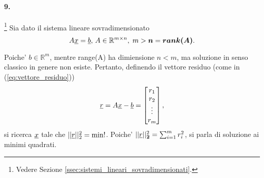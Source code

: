 \paragraph{9.}\footnote{Vedere Sezione \ref{ssec:sistemi_lineari_sovradimensionati}.} Sia dato il sistema lineare sovradimensionato
\begin{equation*}
	A\uline x =\uline b,\, A\in\mathbb R^{m\times n},\; m>\boldsymbol n = \boldsymbol{rank(A)}.
\end{equation*}

Poiche' $b\in\mathbb{R}^m$, mentre \gls{range(A)} ha dimiensione $n<m$, ma soluzione in senso classico in genere non esiste. Pertanto, definendo il vettore residuo (come in (\ref{eq:vettore_residuo}))
\begin{equation}\label{eq:vettore_residuo_esercitazione}
	\uline r = A\uline x-\uline b=
	\begin{bmatrix}
		r_1\\
		r_2\\
		\vdots\\
		r_m
	\end{bmatrix},
\end{equation}
si ricerca $\uline x$ tale che $||\uline r||_2^2=\min!$. Poiche' $||\uline r||_{\boldsymbol{2}}^2=\sum_{i=1}^{m}r_i^2$, si parla di soluzione ai minimi quadrati.

